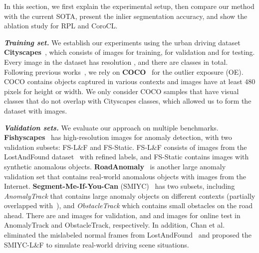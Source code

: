 \documentclass[10pt,twocolumn,letterpaper]{article}
\begin{document}
In this section, we first explain the experimental setup, then compare our method with the current SOTA, present the inlier segmentation accuracy, and show the ablation study for RPL and CoroCL.

\noindent \textit{\textbf{Training set.}} We establish our experiments using the urban driving dataset \textbf{Cityscapes}~\cite{cordts2016cityscapes},  which consists of  images for training,  for validation and  for testing. Every image in the dataset has resolution , and there are  classes in total. Following  previous works~\cite{chan2021entropy, tian2021pixel}, we rely on \textbf{COCO}~\cite{lin2014microsoft} for the outlier exposure (OE). COCO contains objects captured in various contexts and images have at least 480 pixels for height or width. We only consider COCO samples that have visual classes that do not overlap with Cityscapes classes, which allowed us to form the dataset  with   images.

\noindent \textit{\textbf{Validation sets.}} We evaluate our approach on multiple benchmarks.  
\textbf{Fishyscapes}~\cite{blum2021fishyscapes} has high-resolution images for anomaly detection, with two validation subsets: FS-L\&F and FS-Static. FS-L\&F consists of  images from the LostAndFound dataset~\cite{pinggera2016lost} with refined labels, and FS-Static contains  images with synthetic anomalous objects. \textbf{RoadAnomaly}~\cite{lis2019detecting} is another large anomaly validation set that contains real-world anomalous objects with  images from the Internet. 
\textbf{Segment-Me-If-You-Can} (SMIYC)~\cite{chan2021segmentmeifyoucan} has two subsets, including  \textit{AnomalyTrack} that contains large anomaly objects on different contexts (partially overlapped with~\cite{lis2019detecting}), and \textit{ObstacleTrack} which contains small obstacles on the road ahead. There are  and  images for validation, and  and  images for online test in AnomalyTrack and ObstacleTrack, respectively. 
In addition, Chan et al.~\cite{chan2021segmentmeifyoucan} eliminated the mislabeled normal frames from LostAndFound~\cite{pinggera2016lost} and proposed the SMIYC-L\&F to simulate real-world driving scene situations. 
\end{document}

